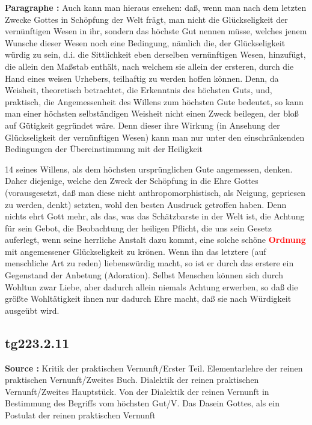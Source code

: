 \documentclass[a4paper,12pt,twoside]{book}
\newcommand{\match}[1]{\textcolor{red}{\textbf{#1}}}
\begin{document}
	\noindent\textbf{Paragraphe : }Auch kann man hieraus ersehen: daß, wenn man nach dem letzten Zwecke Gottes in Schöpfung der Welt frägt, man nicht die Glückseligkeit der vernünftigen Wesen in ihr, sondern das höchste Gut nennen müsse, welches jenem Wunsche dieser Wesen noch eine Bedingung, nämlich die, der Glückseligkeit würdig zu sein, d.i. die Sittlichkeit eben derselben vernünftigen Wesen, hinzufügt, die allein den Maßstab enthält, nach welchem sie allein der ersteren, durch die Hand eines weisen Urhebers, teilhaftig zu werden hoffen können. Denn, da Weisheit, theoretisch betrachtet, die Erkenntnis des höchsten Guts, und, praktisch, die Angemessenheit des Willens zum höchsten Gute bedeutet, so kann man einer höchsten selbständigen Weisheit nicht einen Zweck beilegen, der bloß auf Gütigkeit gegründet wäre. Denn dieser ihre Wirkung (in Ansehung der Glückseligkeit der vernünftigen Wesen)  kann man nur unter den einschränkenden Bedingungen der Übereinstimmung mit der Heiligkeit
	
	
	
	14
	seines Willens, als dem höchsten ursprünglichen Gute angemessen, denken. Daher diejenige, welche den Zweck der Schöpfung in die Ehre Gottes (vorausgesetzt, daß man diese nicht anthropomorphistisch, als Neigung, gepriesen zu werden, denkt) setzten, wohl den besten Ausdruck getroffen haben. Denn nichts ehrt Gott mehr, als das, was das Schätzbarste in der Welt ist, die Achtung für sein Gebot, die Beobachtung der heiligen Pflicht, die uns sein Gesetz auferlegt, wenn seine herrliche Anstalt dazu kommt, eine solche schöne \match{Ordnung} mit angemessener Glückseligkeit zu krönen. Wenn ihn das letztere (auf menschliche Art zu reden) liebenswürdig macht, so ist er durch das erstere ein Gegenstand der Anbetung (Adoration). Selbst Menschen können sich durch Wohltun zwar Liebe, aber dadurch allein niemals Achtung erwerben, so daß die größte Wohltätigkeit ihnen nur dadurch Ehre macht, daß sie nach Würdigkeit ausgeübt wird. 
	
	\subsection*{tg223.2.11} 
	\textbf{Source : }Kritik der praktischen Vernunft/Erster Teil. Elementarlehre der reinen praktischen Vernunft/Zweites Buch. Dialektik der reinen praktischen Vernunft/Zweites Hauptstück. Von der Dialektik der reinen Vernunft in Bestimmung des Begriffs vom höchsten Gut/V. Das Dasein Gottes, als ein Postulat der reinen praktischen Vernunft\\  
	
\end{document}
